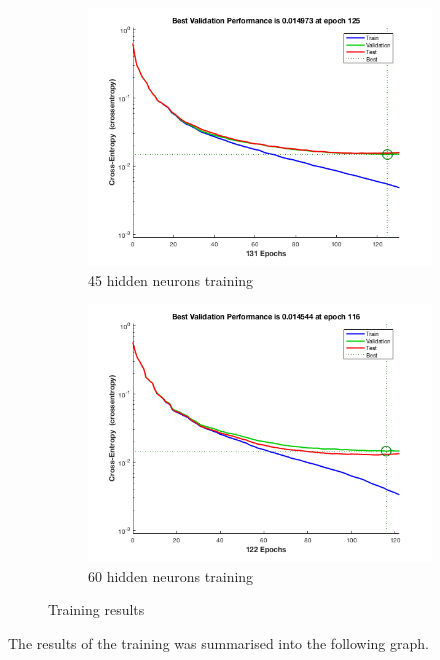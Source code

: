 \begin{figure}
  \begin{subfigure}[t]{.5\textwidth}
    \centering
	\includegraphics[width=\linewidth]{../../pracs/week7/images/45_hidden_neurons}
	\caption{45 hidden neurons training}
  \end{subfigure}
  \hfill
  \begin{subfigure}[t]{.5\textwidth}
    \centering
	\includegraphics[width=\linewidth]{../../pracs/week7/images/60_hidden_neurons}
	\caption{60 hidden neurons training}
  \end{subfigure}
    \caption{Training results\label{fig:training_results}}
\end{figure}

The results of the training was summarised into the following graph.

